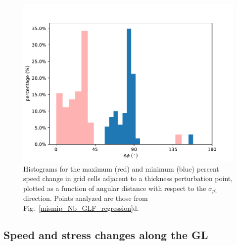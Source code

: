 \documentclass[tc, manuscript]{copernicus}
\begin{document}
\begin{figure}
	\centering
    \includegraphics[width=1\linewidth]{figs/perturb_theta_velchange.pdf}
    \caption{Histograms for the maximum (red) and minimum (blue) percent speed change in grid cells adjacent to a thickness perturbation point, plotted as a function of angular distance with respect to the $\sigma_{p1}$ direction. Points analyzed are those from Fig.~\ref{mismip_Nb_GLF_regression}d.}
	\label{perturb_theta_velchange}
\end{figure}

\subsection{Speed and stress changes along the GL}
\end{document}
